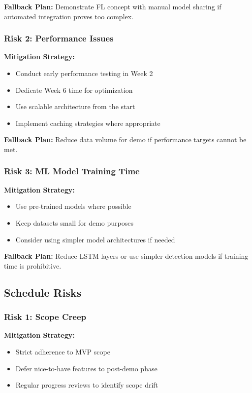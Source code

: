 \documentclass[12pt,a4paper]{article}
\begin{document}
\textbf{Fallback Plan:}
Demonstrate FL concept with manual model sharing if automated integration proves too complex.

\subsubsection{Risk 2: Performance Issues}

\textbf{Mitigation Strategy:}
\begin{itemize}[leftmargin=1cm,itemsep=0pt]
    \item Conduct early performance testing in Week 2
    \item Dedicate Week 6 time for optimization
    \item Use scalable architecture from the start
    \item Implement caching strategies where appropriate
\end{itemize}

\textbf{Fallback Plan:}
Reduce data volume for demo if performance targets cannot be met.

\subsubsection{Risk 3: ML Model Training Time}

\textbf{Mitigation Strategy:}
\begin{itemize}[leftmargin=1cm,itemsep=0pt]
    \item Use pre-trained models where possible
    \item Keep datasets small for demo purposes
    \item Consider using simpler model architectures if needed
\end{itemize}

\textbf{Fallback Plan:}
Reduce LSTM layers or use simpler detection models if training time is prohibitive.

\subsection{Schedule Risks}

\subsubsection{Risk 1: Scope Creep}

\textbf{Mitigation Strategy:}
\begin{itemize}[leftmargin=1cm,itemsep=0pt]
    \item Strict adherence to MVP scope
    \item Defer nice-to-have features to post-demo phase
    \item Regular progress reviews to identify scope drift
\end{itemize}
\end{document}

